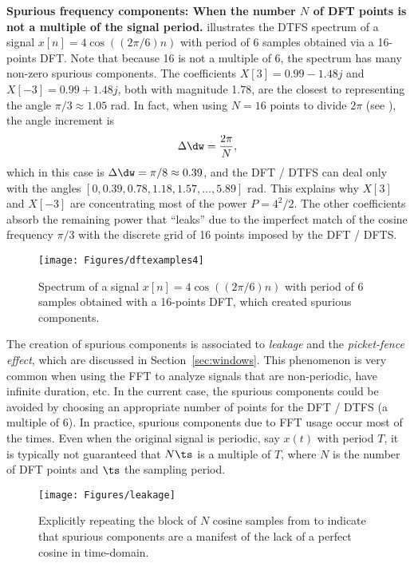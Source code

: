\bApplication \textbf{Spurious frequency components: When the number $N$ of DFT points is not a multiple of the signal period.}
\label{app:spectral_leakage}
 illustrates the DTFS spectrum of a signal $x[n]=4 \cos((2\pi/6)n)$ with period of 6 samples obtained via a 16-points DFT. Note that because 16 is not a multiple of 6, the spectrum has many non-zero spurious components. The coefficients $X[3]=0.99 - 1.48 j$ and $X[-3]=0.99 + 1.48 j$, both with magnitude 1.78, are the closest to representing the angle $\pi/3 \approx 1.05$ rad. In fact, when using $N=16$ points to divide $2 \pi$ (see ), the angle increment is
\begin{equation}
\Delta \dw = \frac{2 \pi}{N},
\label{eq:fft_delta_dw}
\end{equation}
which in this case is $\Delta \dw = \pi/8 \approx 0.39$, and the DFT / DTFS can deal only with the angles $[0, 0.39,    0.78,    1.18,    1.57, \ldots, 5.89]$ rad. This explains why $X[3]$ and $X[-3]$ are concentrating most of the power $P=4^2/2$. The other coefficients absorb the remaining power that ``leaks'' due to the imperfect match of the cosine frequency $\pi/3$ with the discrete grid of 16 points imposed by the DFT / DFTS.

\begin{figure}[!htb]
        \centering
                \texttt{[image: Figures/dftexamples4]}        
        \caption{Spectrum of a signal $x[n]=4 \cos((2\pi/6)n)$ with period of 6 samples obtained with a 16-points DFT, which created spurious components.\label{fig:dftexamples4}}
\end{figure}

The creation of spurious components is associated to \emph{leakage} and the 
 \emph{picket-fence effect}, which are discussed in Section~\ref{sec:windows}. This
phenomenon is very common when using the FFT to analyze signals that are non-periodic, have infinite duration, etc. In the current case, the spurious components could be avoided by choosing an appropriate number of points for the DFT / DTFS (a multiple of 6). In practice, spurious components due to FFT usage occur most of the times. Even when the original signal is periodic, say $x(t)$ with period $T$, it is typically not guaranteed that $N \ts$ is a multiple of $T$, where $N$ is the number of DFT points and $\ts$ the sampling period.

\begin{figure}[!htb]
        \centering
                \texttt{[image: Figures/leakage]}             
        \caption{Explicitly repeating the block of $N$ cosine samples from  to indicate that spurious components are a manifest of the lack of a perfect cosine in time-domain.\label{fig:leakage}}
\end{figure}

